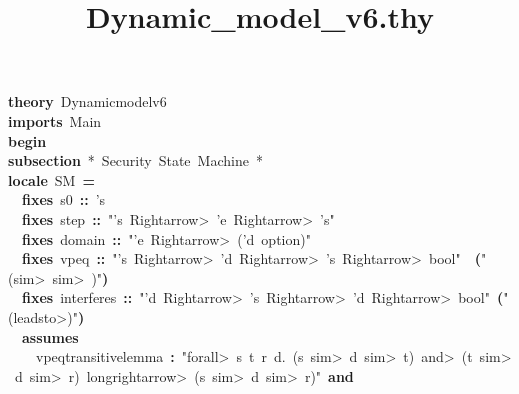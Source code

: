 \documentclass{article}
\title{Dynamic_model_v6.thy}
\newcommand{\syntaxNULL}[1]{\textcolor[rgb]{0.0,0.0,0.0}{#1}}
\newcommand{\syntaxCOMMENTC}[1]{\textcolor[rgb]{0.4,0.0,0.8}{#1}}
\newcommand{\syntaxKEYWORDA}[1]{\textcolor[rgb]{0.0,0.4,0.6}{\textbf{#1}}}
\newcommand{\syntaxKEYWORDB}[1]{\textcolor[rgb]{0.0,0.6,0.4}{\textbf{#1}}}
\newcommand{\syntaxLITERALA}[1]{\textcolor[rgb]{1.0,0.0,0.8}{#1}}
\newcommand{\syntaxOPERATOR}[1]{\textcolor[rgb]{0.0,0.0,0.0}{\textbf{#1}}}
\newcommand{\syntaxNULL}[1]{\textcolor[rgb]{0.0,0.0,0.0}{#1}}
\newcommand{\syntaxCOMMENTC}[1]{\textcolor[rgb]{0.4,0.0,0.8}{#1}}
\newcommand{\syntaxKEYWORDA}[1]{\textcolor[rgb]{0.0,0.4,0.6}{\textbf{#1}}}
\newcommand{\syntaxKEYWORDB}[1]{\textcolor[rgb]{0.0,0.6,0.4}{\textbf{#1}}}
\newcommand{\syntaxLITERALA}[1]{\textcolor[rgb]{1.0,0.0,0.8}{#1}}
\newcommand{\syntaxOPERATOR}[1]{\textcolor[rgb]{0.0,0.0,0.0}{\textbf{#1}}}
\newcommand{\syntaxNULL}[1]{\textcolor[rgb]{0.0,0.0,0.0}{#1}}
\newcommand{\syntaxCOMMENTC}[1]{\textcolor[rgb]{0.4,0.0,0.8}{#1}}
\newcommand{\syntaxKEYWORDA}[1]{\textcolor[rgb]{0.0,0.4,0.6}{\textbf{#1}}}
\newcommand{\syntaxKEYWORDB}[1]{\textcolor[rgb]{0.0,0.6,0.4}{\textbf{#1}}}
\newcommand{\syntaxLITERALA}[1]{\textcolor[rgb]{1.0,0.0,0.8}{#1}}
\newcommand{\syntaxOPERATOR}[1]{\textcolor[rgb]{0.0,0.0,0.0}{\textbf{#1}}}
\newcommand{\syntaxNULL}[1]{\textcolor[rgb]{0.0,0.0,0.0}{\textbf{#1}}}
\newcommand{\syntaxCOMMENTC}[1]{\textcolor[rgb]{0.4,0.0,0.8}{\textbf{#1}}}
\newcommand{\syntaxKEYWORDA}[1]{\textcolor[rgb]{0.0,0.4,0.6}{#1}}
\newcommand{\syntaxKEYWORDB}[1]{\textcolor[rgb]{0.0,0.6,0.4}{#1}}
\newcommand{\syntaxLITERALA}[1]{\textcolor[rgb]{1.0,0.0,0.8}{\textbf{#1}}}
\newcommand{\syntaxOPERATOR}[1]{\textcolor[rgb]{0.0,0.0,0.0}{#1}}
\newcommand{\syntaxNULL}[1]{\textcolor[rgb]{0.0,0.0,0.0}{#1}}
\newcommand{\syntaxCOMMENTC}[1]{\textcolor[rgb]{0.4,0.0,0.8}{#1}}
\newcommand{\syntaxKEYWORDA}[1]{\textcolor[rgb]{0.0,0.4,0.6}{\textbf{#1}}}
\newcommand{\syntaxKEYWORDB}[1]{\textcolor[rgb]{0.0,0.6,0.4}{\textbf{#1}}}
\newcommand{\syntaxLITERALA}[1]{\textcolor[rgb]{1.0,0.0,0.8}{#1}}
\newcommand{\syntaxOPERATOR}[1]{\textcolor[rgb]{0.0,0.0,0.0}{\textbf{#1}}}
\newcommand{\syntaxNULL}[1]{\textcolor[rgb]{0.0,0.0,0.0}{#1}}
\newcommand{\syntaxCOMMENTC}[1]{\textcolor[rgb]{0.4,0.0,0.8}{#1}}
\newcommand{\syntaxKEYWORDA}[1]{\textcolor[rgb]{0.0,0.4,0.6}{\textbf{#1}}}
\newcommand{\syntaxKEYWORDB}[1]{\textcolor[rgb]{0.0,0.6,0.4}{\textbf{#1}}}
\newcommand{\syntaxLITERALA}[1]{\textcolor[rgb]{1.0,0.0,0.8}{#1}}
\newcommand{\syntaxOPERATOR}[1]{\textcolor[rgb]{0.0,0.0,0.0}{\textbf{#1}}}
\newcommand{\syntaxNULL}[1]{\textcolor[rgb]{1.0,1.0,1.0}{#1}}
\begin{document}
\pagecolor{bgcolor}
\noindent
\ttfamily
\syntaxNULL{}\syntaxKEYWORDA{theory}{\ }Dynamic\usebox{\underscorebox}model\usebox{\underscorebox}v6\hspace*{\fill}\\
\syntaxKEYWORDB{imports}{\ }Main\hspace*{\fill}\\
\syntaxKEYWORDB{begin}\hspace*{\fill}\\
\syntaxKEYWORDA{subsection}{\ }\syntaxCOMMENTC{\usebox{\opencurlybracket}*{\ }Security{\ }State{\ }Machine{\ }*\usebox{\closecurlybracket}}\hspace*{\fill}\\
\syntaxKEYWORDA{locale}{\ }SM{\ }\syntaxOPERATOR{=}\hspace*{\fill}\\
{\ }{\ }\syntaxKEYWORDB{fixes}{\ }s0{\ }\syntaxOPERATOR{::}{\ }'s\hspace*{\fill}\\
{\ }{\ }\syntaxKEYWORDB{fixes}{\ }step{\ }\syntaxOPERATOR{::}{\ }\syntaxLITERALA{"'s{\ }\<Rightarrow>{\ }'e{\ }\<Rightarrow>{\ }'s"}\hspace*{\fill}\\
{\ }{\ }\syntaxKEYWORDB{fixes}{\ }domain{\ }\syntaxOPERATOR{::}{\ }\syntaxLITERALA{"'e{\ }\<Rightarrow>{\ }('d{\ }option)"}\hspace*{\fill}\\
{\ }{\ }\syntaxKEYWORDB{fixes}{\ }vpeq{\ }\syntaxOPERATOR{::}{\ }\syntaxLITERALA{"'s{\ }\<Rightarrow>{\ }'d{\ }\<Rightarrow>{\ }'s{\ }\<Rightarrow>{\ }bool"}{\ }{\ }\syntaxOPERATOR{(}\syntaxLITERALA{"(\usebox{\underscorebox}{\ }\<sim>{\ }\usebox{\underscorebox}{\ }\<sim>{\ }\usebox{\underscorebox})"}\syntaxOPERATOR{)}\hspace*{\fill}\\
{\ }{\ }\syntaxKEYWORDB{fixes}{\ }interferes{\ }\syntaxOPERATOR{::}{\ }\syntaxLITERALA{"'d{\ }\<Rightarrow>{\ }'s{\ }\<Rightarrow>{\ }'d{\ }\<Rightarrow>{\ }bool"}{\ }\syntaxOPERATOR{(}\syntaxLITERALA{"(\usebox{\underscorebox}{\ }\usebox{\atbox}{\ }\usebox{\underscorebox}{\ }\<leadsto>\usebox{\underscorebox})"}\syntaxOPERATOR{)}\hspace*{\fill}\\
{\ }{\ }\syntaxKEYWORDB{assumes}{\ }\hspace*{\fill}\\
{\ }{\ }{\ }{\ }vpeq\usebox{\underscorebox}transitive\usebox{\underscorebox}lemma{\ }\syntaxOPERATOR{:}{\ }\syntaxLITERALA{"\<forall>{\ }s{\ }t{\ }r{\ }d.{\ }(s{\ }\<sim>{\ }d{\ }\<sim>{\ }t){\ }\<and>{\ }(t{\ }\<sim>{\ }d{\ }\<sim>{\ }r){\ }\<longrightarrow>{\ }(s{\ }\<sim>{\ }d{\ }\<sim>{\ }r)"}{\ }\syntaxKEYWORDB{and}\hspace*{\fill}\\
\end{document}
